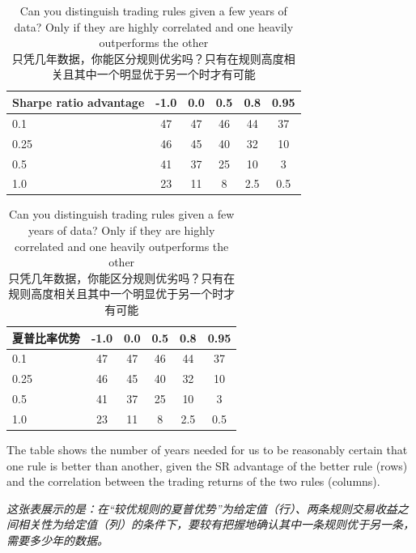 \begin{table}[htbp] \centering \small \caption{Can you distinguish trading rules given a few years of data? Only if they are highly correlated and one heavily outperforms the other\\
只凭几年数据，你能区分规则优劣吗？只有在规则高度相关且其中一个明显优于另一个时才有可能}\begin{englishtableblock} \begin{tabular}{@{} lccccc@{}}
\toprule
Sharpe ratio advantage & -1.0 & 0.0 & 0.5 & 0.8 & 0.95 \\
\midrule
0.1 & 47 & 47 & 46 & 44 & 37 \\
0.25 & 46 & 45 & 40 & 32 & 10 \\
0.5 & 41 & 37 & 25 & 10 & 3 \\
1.0 & 23 & 11 & 8 & 2.5 & 0.5 \\
\bottomrule
\end{tabular}
\end{englishtableblock}

  \medskip

\begin{chinesetableblock} \begin{tabular}{@{} lccccc@{}}
\toprule
夏普比率优势 & -1.0 & 0.0 & 0.5 & 0.8 & 0.95 \\
\midrule
0.1 & 47 & 47 & 46 & 44 & 37 \\
0.25 & 46 & 45 & 40 & 32 & 10 \\
0.5 & 41 & 37 & 25 & 10 & 3 \\
1.0 & 23 & 11 & 8 & 2.5 & 0.5 \\
\bottomrule
\end{tabular}
\end{chinesetableblock}
\end{table}

\begin{englishblock} The table shows the number of years needed for us to be reasonably certain that one rule is better than another, given the SR advantage of the better rule (rows) and the correlation between the trading returns of the two rules (columns). \end{englishblock}

\begin{chineseblock} \textit{这张表展示的是：在“较优规则的夏普优势”为给定值（行）、两条规则交易收益之间相关性为给定值（列）的条件下，要较有把握地确认其中一条规则优于另一条，需要多少年的数据。}\end{chineseblock}


